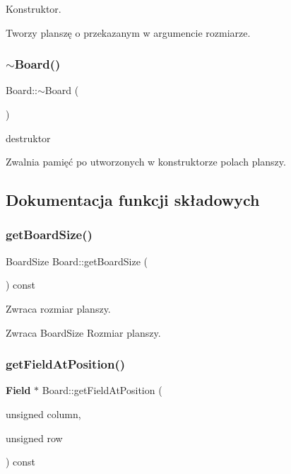 Konstruktor. 

Tworzy planszę o przekazanym w argumencie rozmiarze. \mbox{\label{class_board_af73f45730119a1fd8f6670f53f959e68}} 
\subsubsection{$\sim$Board()}
{\footnotesize\ttfamily Board\+::$\sim$\+Board (\begin{DoxyParamCaption}{ }\end{DoxyParamCaption})}



destruktor 

Zwalnia pamięć po utworzonych w konstruktorze polach planszy. 

\subsection{Dokumentacja funkcji składowych}
\mbox{\label{class_board_ac3aaabcbdd9530414c4238eecdde8c14}} 
\subsubsection{getBoardSize()}
{\footnotesize\ttfamily Board\+Size Board\+::get\+Board\+Size (\begin{DoxyParamCaption}{ }\end{DoxyParamCaption}) const}



Zwraca rozmiar planszy. 

\begin{DoxyReturn}{Zwraca}
Board\+Size Rozmiar planszy. 
\end{DoxyReturn}
\mbox{\label{class_board_a43c73b140d9b19aeec5788991bc1ec22}} 
\subsubsection{getFieldAtPosition()}
{\footnotesize\ttfamily \textbf{ Field} $\ast$ Board\+::get\+Field\+At\+Position (\begin{DoxyParamCaption}\item[{unsigned}]{column,  }\item[{unsigned}]{row }\end{DoxyParamCaption}) const}



